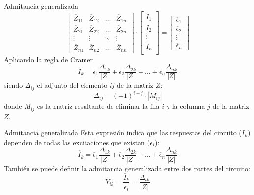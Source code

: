\documentclass[aspectratio=169, usenames,svgnames,dvipsnames]{beamer}
\begin{document}
\begin{frame}[label={sec:org5a7a818}]{Admitancia generalizada}
\begin{equation*}
  \begin{bmatrix}
    \overline{Z}_{11} & \overline{Z}_{12} & \dots & \overline{Z}_{1n} \\
    \overline{Z}_{21} & \overline{Z}_{22} & \dots & \overline{Z}_{2n} \\
    \vdots & \vdots & \ddots & \vdots \\
    \overline{Z}_{n1} & \overline{Z}_{n2} &  \dots & \overline{Z}_{nn}
  \end{bmatrix} \cdot %
  \begin{bmatrix}
    \overline{I}_1\\
    \overline{I}_2\\
    \vdots \\
    \overline{I}_n\\
  \end{bmatrix} = %
  \begin{bmatrix}
    \overline{\epsilon}_1\\
    \overline{\epsilon}_2\\
    \vdots \\
    \overline{\epsilon}_n
  \end{bmatrix}
\end{equation*}
Aplicando la regla de Cramer
\[
  \overline{I}_k = \overline{\epsilon}_1 \frac{\Delta_{1k}}{|Z|} + \overline{\epsilon}_2 \frac{\Delta_{2k}}{|Z|} + \dots + \overline{\epsilon}_n \frac{\Delta_{nk}}{|Z|}
\]
siendo \(\Delta_{ij}\) el adjunto del elemento \(ij\) de la matriz \(Z\):
\[
  \Delta_{ij} = (-1)^{i+j} \cdot |M_{ij}|
\]
donde \(M_{ij}\) es la matriz resultante de eliminar la fila \(i\) y la columna \(j\) de la matriz \(Z\).
\end{frame}

\begin{frame}[label={sec:org71b054d}]{Admitancia generalizada}
Esta expresión indica que las respuestas del circuito (\(I_k\)) dependen de todas las excitaciones que existan (\(\epsilon_i\)):
\[
  \overline{I}_k = \overline{\epsilon}_1 \frac{\Delta_{1k}}{|Z|} + \overline{\epsilon}_2 \frac{\Delta_{2k}}{|Z|} + \dots + \overline{\epsilon}_n \frac{\Delta_{nk}}{|Z|}
\]
También se puede definir la admitancia generalizada entre dos partes del circuito:
\[
  \overline{Y}_{ik} = \frac{\overline{I}_k}{\overline{\epsilon}_i} = \frac{\Delta_{ik}}{|Z|}
\]
\end{frame}
\end{document}
